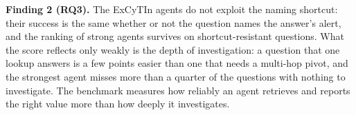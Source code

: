 \smallskip\noindent\textbf{Finding 2 (RQ3).} The ExCyTIn agents do not exploit the naming shortcut: their success is the same whether or not the question names the answer's alert, and the ranking of strong agents survives on shortcut-resistant questions. What the score reflects only weakly is the depth of investigation: a question that one lookup answers is a few points easier than one that needs a multi-hop pivot, and the strongest agent misses more than a quarter of the questions with nothing to investigate. The benchmark measures how reliably an agent retrieves and reports the right value more than how deeply it investigates.
